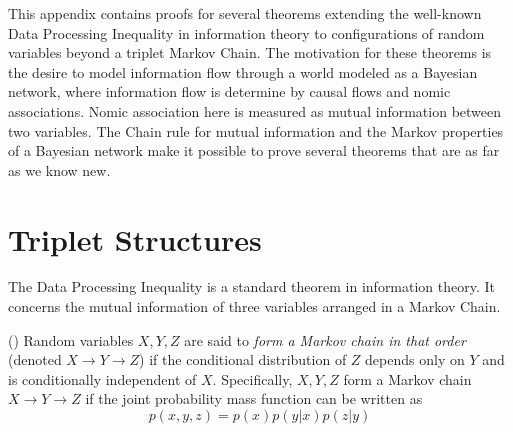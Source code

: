 \documentclass[../thesis.tex]{subfiles}
\begin{document}
This appendix contains proofs for several theorems extending
the well-known Data Processing Inequality in information theory
to configurations of random variables beyond a triplet Markov Chain.
The motivation for these theorems is the desire to model information
flow through a world modeled as a Bayesian network, where information
flow is determine by causal flows and nomic associations.
Nomic association here is measured as mutual information between two variables.
The Chain rule for mutual information and the Markov properties of
a Bayesian network make it possible to prove several theorems that are
as far as we know new.

\section{Triplet Structures}

The Data Processing Inequality is a standard theorem in information theory.
It concerns the mutual information of three variables arranged in a
Markov Chain.

\begin{dfn}
  (\citet{cover2012elements})
  Random variables $X, Y, Z$ are said to \emph{form a Markov chain in that order}
  (denoted $X \rightarrow Y \rightarrow Z$) if the conditional distribution
  of $Z$ depends only on $Y$ and is conditionally independent of $X$.
  Specifically, $X,Y,Z$ form a Markov chain $X \rightarrow Y \rightarrow Z$
  if the joint probability mass function can be written as
  \begin{equation}
    p(x,y,z) = p(x)p(y \vert x)p(z \vert y)
  \end{equation}
\end{dfn}
\end{document}
